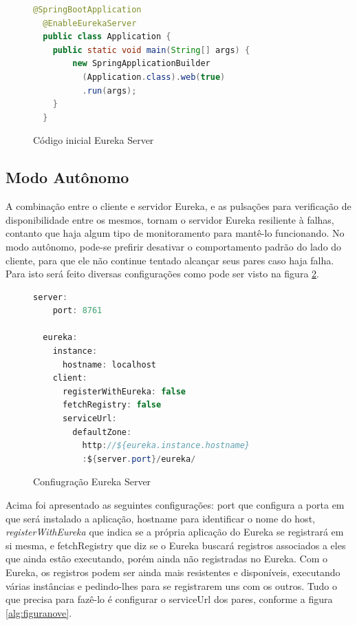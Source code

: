 \documentclass[journal]{IEEEtran}
\begin{document}
\begin{figure}[h]
\centering

\begin{lstlisting}[language=Java]
  @SpringBootApplication
  @EnableEurekaServer
  public class Application {
    public static void main(String[] args) {
        new SpringApplicationBuilder
          (Application.class).web(true)
          .run(args);
    }
  }
\end{lstlisting}

\caption{Código inicial Eureka Server}
\label{alg:figurasete}
\end{figure}

\subsection{Modo Autônomo}

A combinação entre o cliente e servidor Eureka, e as pulsações para verificação de disponibilidade entre os mesmos, tornam o servidor Eureka resiliente à falhas, contanto que haja algum tipo de monitoramento para mantê-lo funcionando. No modo autônomo, pode-se prefirir desativar o comportamento padrão do lado do cliente, para que ele não continue tentado alcançar seus pares caso haja falha. Para isto será feito diversas configurações como pode ser visto na figura \ref{alg:figuraoito}.

\begin{figure}[h]
\centering

\begin{lstlisting}[language=Java]
  server:
    port: 8761

  eureka:
    instance:
      hostname: localhost
    client:
      registerWithEureka: false
      fetchRegistry: false
      serviceUrl:
        defaultZone: 
          http://${eureka.instance.hostname}
          :${server.port}/eureka/
\end{lstlisting}

\caption{Confiugração Eureka Server}
\label{alg:figuraoito}
\end{figure}

Acima foi apresentado as seguintes configurações: port que configura a porta em que será instalado a aplicação, hostname para identificar o nome do host, \emph{registerWithEureka} que indica se a própria aplicação do Eureka se registrará em si mesma, e fetchRegistry que diz se o Eureka buscará registros associados a eles que ainda estão executando, porém ainda não registradas no Eureka.
Com o Eureka, os registros podem ser ainda mais resistentes e disponíveis, executando várias instâncias e pedindo-lhes para se registrarem uns com os outros. Tudo o que precisa para fazê-lo é configurar o serviceUrl dos pares, conforme a figura \ref{alg:figuranove}.
\end{document}
